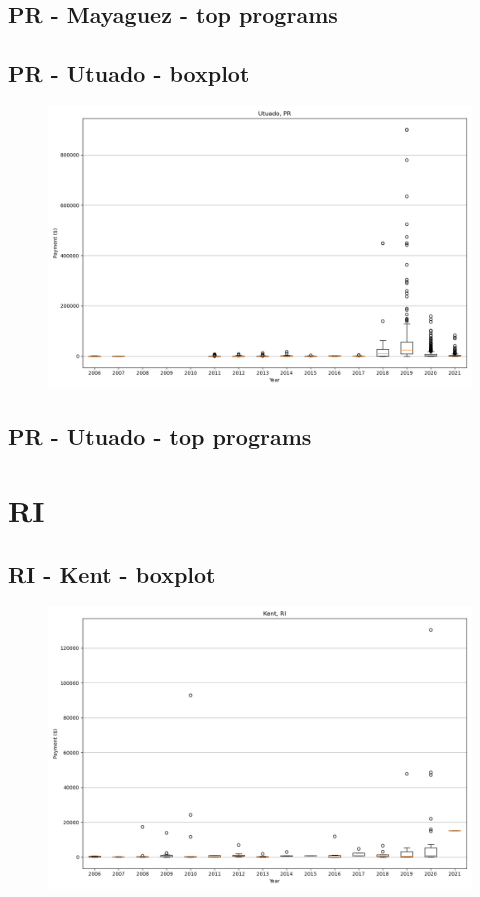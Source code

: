 \subsection*{PR - Mayaguez - top programs}

\newpage
\subsection*{PR - Utuado - boxplot}
\begin{figure}[h]
\centering
\includegraphics[width=7in]{../output/boxplots/counties/Utuado-PR_boxplot.png}
\end{figure}


\subsection*{PR - Utuado - top programs}

\newpage
\section*{RI}
\subsection*{RI - Kent - boxplot}
\begin{figure}[h]
\centering
\includegraphics[width=7in]{../output/boxplots/counties/Kent-RI_boxplot.png}
\end{figure}


